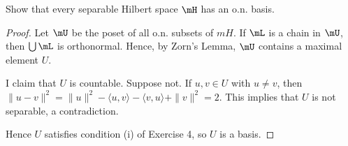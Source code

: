 \documentclass{article}
\begin{document}
 Show that every separable Hilbert space $\mH$ has an o.n. basis.
\begin{proof}
Let $\mU$ be the poset of all o.n. subsets of $mH$.  If $\mL$ is a chain in $\mU$, then $\bigcup \mL$ is orthonormal.  Hence, by Zorn's Lemma, $\mU$ contains a maximal element $U$. 

I claim that $U$ is countable.  Suppose not. If $u,v \in U$ with $u \neq v$, then $\|u - v\|^2 = \|u\|^2 - \langle u, v \rangle - \langle v, u \rangle + \|v\|^2 = 2$.  This implies that $U$ is not separable, a contradiction.

Hence $U$ satisfies condition (i) of Exercise 4, so $U$ is a basis.
\end{proof}
\end{document}
